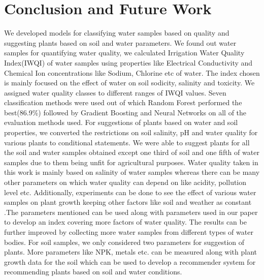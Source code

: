 \section{Conclusion and Future Work}
\label{section:conclusionAndFutureWork}
We developed models for classifying water samples based on quality and suggesting plants based on soil and water parameters. We found out water samples  for quantifying water quality, we calculated Irrigation Water Quality Index(IWQI) of water samples using properties like Electrical Conductivity and Chemical Ion concentrations like Sodium, Chlorine etc of water. The index chosen is mainly focused on the effect of water on soil sodicity, salinity and toxicity. We assigned water quality classes to different ranges of IWQI values. Seven classification methods were used out of which Random Forest performed the best(86.9\%) followed by Gradient Boosting and Neural Networks on all of the evaluation methods used. For suggestions of plants based on water and soil properties, we converted the restrictions on soil salinity, pH and water quality for various plants to conditional statements. We were able to suggest plants for all the soil and water samples obtained except one third of soil and one fifth of water samples due to them being unfit for agricultural purposes.
Water quality taken in this work is mainly based on salinity of water samples whereas there can be many other parameters on which water quality can depend on like acidity, pollution level etc. Additionally, experiments can be done to see the effect of various water samples on plant growth keeping other factors like soil and weather as constant .The parameters mentioned can be used along with parameters used in our paper to develop an index covering more factors of water quality. The results can be further improved by collecting  more water samples from different types of water bodies. For soil samples, we only considered two parameters for suggestion of plants. More parameters like NPK, metals etc. can be measured along with plant growth data for the soil which can be used to develop a recommender system for recommending plants based on soil and water conditions.






 



